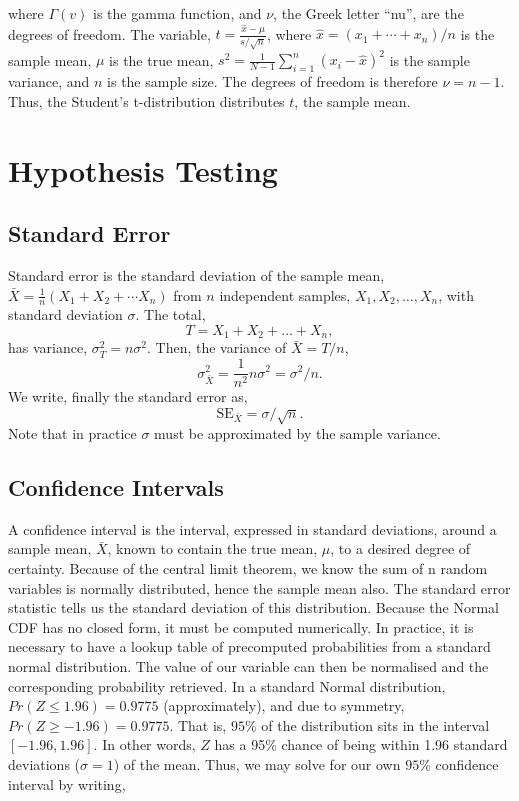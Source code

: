 \documentclass[11pt]{amsart}
\begin{document}
where $\Gamma(v)$ is the gamma function, and $\nu$, the Greek letter ``nu'', are the degrees of freedom. The variable, $t = \frac{\hat{x} - \mu}{s/\sqrt{n}}$, where $\hat{x} = (x_1 + \cdots + x_n)/n$ is the sample mean, $\mu$ is the true mean, $s^2 = \frac{1}{N - 1}\sum_{i=1}^{n} (x_i - \hat{x})^2$ is the sample variance, and $n$ is the sample size. The degrees of freedom is therefore $\nu = n - 1$. Thus, the Student's t-distribution distributes $t$, the sample mean.

\section{Hypothesis Testing}

\subsection{Standard Error}

Standard error is the standard deviation of the sample mean, $\bar{X} = \frac{1}{n}(X_1 + X_2 + \cdots X_n)$ from $n$ independent samples, $X_1, X_2, \dots, X_n$, with standard deviation $\sigma$. The total, $$T = X_1 + X_2 + \dots + X_n,$$ has variance, $\sigma_T^2 = n\sigma^2$. Then, the variance of $\bar{X} = T/n$, $$\sigma_{\bar{X}}^2 = \frac{1}{n^2}n\sigma^2 = \sigma^2/n.$$ We write, finally the standard error as, $$\text{SE}_{\bar{X}} = \sigma/\sqrt{n}.$$ Note that in practice $\sigma$ must be approximated by the sample variance.

\subsection{Confidence Intervals}

A confidence interval is the interval, expressed in standard deviations, around a sample mean, $\bar{X}$, known to contain the true mean, $\mu$, to a desired degree of certainty. Because of the central limit theorem, we know the sum of n random variables is normally distributed, hence the sample mean also. The standard error statistic tells us the standard deviation of this distribution. Because the Normal CDF has no closed form, it must be computed numerically. In practice, it is necessary to have a lookup table of precomputed probabilities from a standard normal distribution. The value of our variable can then be normalised and the corresponding probability retrieved. In a standard Normal distribution, $Pr(Z \leq 1.96) = 0.9775$ (approximately), and due to symmetry, $Pr(Z \geq - 1.96) = 0.9775$. That is, $95\%$ of the distribution sits in the interval $[-1.96, 1.96]$. In other words, $Z$ has a 95\% chance of being within 1.96 standard deviations ($\sigma = 1$) of the mean. Thus, we may solve for our own $95\%$ confidence interval by writing,
\end{document}
